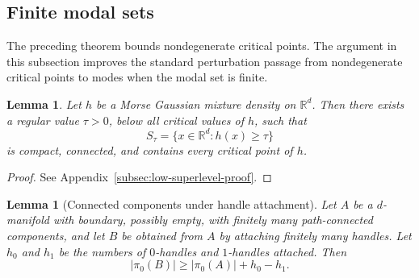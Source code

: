 \documentclass[11pt]{article}
\theoremstyle{plain}
\newtheorem{lemma}[theorem]{Lemma}
\theoremstyle{definition}
\theoremstyle{remark}
\numberwithin{equation}{section}
\newcommand{\R}{\mathbb{R}}
\begin{document}
\subsection{Finite modal sets}\label{subsec:morse-factor}

The preceding theorem bounds nondegenerate critical points. The argument in this subsection improves the standard perturbation passage from nondegenerate critical points to modes when the modal set is finite.

\begin{lemma}\label{lem:low-superlevel-connected}
Let $h$ be a Morse Gaussian mixture density on $\R^d$. Then there exists a regular value $\tau>0$, below all critical values of $h$, such that
\[
S_\tau=\{x\in\R^d:h(x)\ge \tau\}
\]
is compact, connected, and contains every critical point of $h$.
\end{lemma}

\begin{proof}
See Appendix~\ref{subsec:low-superlevel-proof}.
\end{proof}


\begin{lemma}[Connected components under handle attachment]\label{lem:handle-components}
Let $A$ be a $d$-manifold with boundary, possibly empty, with finitely many path-connected components, and let $B$ be obtained from $A$ by attaching finitely many handles. Let $h_0$ and $h_1$ be the numbers of $0$-handles and $1$-handles attached. Then
\[
|\pi_0(B)|\ge |\pi_0(A)|+h_0-h_1.
\]
\end{lemma}
\end{document}
